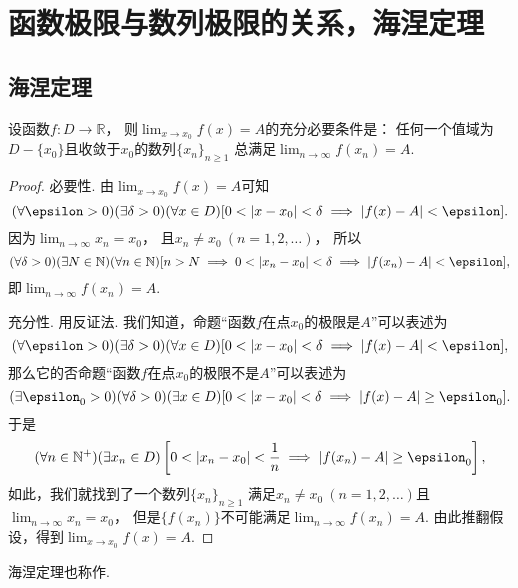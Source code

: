 \section{函数极限与数列极限的关系，海涅定理}
\subsection{海涅定理}
\begin{theorem}[海涅定理]\label{theorem:极限.海涅定理}
设函数\(f\colon D\to\mathbb{R}\)，
则\(\lim_{x \to x_0} f(x) = A\)的充分必要条件是：
任何一个值域为\(D-\{x_0\}\)且收敛于\(x_0\)的数列\(\{x_n\}_{n\geq1}\)
总满足\(\lim_{n\to\infty} f(x_n) = A\).
\begin{proof}
必要性.
由\(\lim_{x \to x_0} f(x) = A\)可知\begin{equation*}
	(\forall\epsilon>0)
	(\exists\delta>0)
	(\forall x\in D)
	[
		0<\abs{x-x_0}<\delta
		\implies
		\abs{f(x)-A}<\epsilon
	].
\end{equation*}
因为\(\lim_{n\to\infty} x_n = x_0\)，
且\(x_n \neq x_0\ (n=1,2,\dotsc)\)，
所以\begin{equation*}
	(\forall\delta>0)
	(\exists N\in\mathbb{N})
	(\forall n\in\mathbb{N})
	[
		n>N
		\implies
		0<\abs{x_n-x_0}<\delta
		\implies
		\abs{f(x_n)-A}<\epsilon
	],
\end{equation*}
即\(\lim_{n\to\infty} f(x_n) = A\).

充分性.
用反证法.
我们知道，命题“函数\(f\)在点\(x_0\)的极限是\(A\)”可以表述为\begin{equation*}
	(\forall\epsilon>0)
	(\exists\delta>0)
	(\forall x\in D)
	[
		0<\abs{x-x_0}<\delta
		\implies
		\abs{f(x)-A}<\epsilon
	],
\end{equation*}
那么它的否命题“函数\(f\)在点\(x_0\)的极限不是\(A\)”可以表述为\begin{equation*}
	(\exists\epsilon_0>0)
	(\forall\delta>0)
	(\exists x\in D)
	[
		0<\abs{x-x_0}<\delta
		\implies
		\abs{f(x)-A}\geq\epsilon_0
	].
\end{equation*}
于是\begin{equation*}
	(\forall n\in\mathbb{N}^+)
	(\exists x_n\in D)
	\left[
		0<\abs{x_n-x_0}<\frac1n
		\implies
		\abs{f(x_n)-A}\geq\epsilon_0
	\right],
\end{equation*}
如此，我们就找到了一个数列\(\{x_n\}_{n\geq1}\)
满足\(x_n\neq x_0\ (n=1,2,\dotsc)\)且\(\lim_{n\to\infty} x_n = x_0\)，
但是\(\{f(x_n)\}\)不可能满足\(\lim_{n\to\infty} f(x_n) = A\).
由此推翻假设，得到\(\lim_{x\to x_0} f(x) = A\).
\end{proof}
\end{theorem}
海涅定理也称作.

